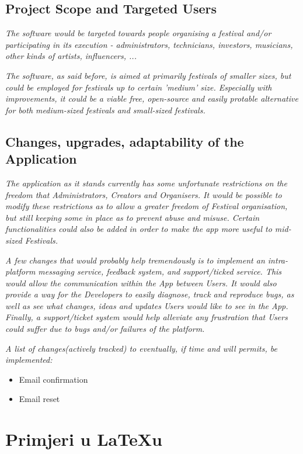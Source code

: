 	\subsection{Project Scope and Targeted Users}
	\textit{The software would be targeted towards people organising a festival and/or participating in its execution - administrators, technicians, investors, musicians, other kinds of artists, influencers, ...}
	
	\textit{The software, as said before, is aimed at primarily festivals of smaller sizes, but could be employed for festivals up to certain 'medium' size. Especially with improvements, it could be a viable free, open-source and easily protable alternative for both medium-sized festivals and small-sized festivals.}
	
	\subsection{Changes, upgrades, adaptability of the Application}
	\textit{The application as it stands currently has some unfortunate restrictions on the freedom that Administrators, Creators and Organisers. It would be possible to modify these restrictions as to allow a greater freedom of Festival organisation, but still keeping some in place as to prevent abuse and misuse. Certain functionalities could also be added in order to make the app more useful to mid-sized Festivals.}
	
	\textit{A few changes that would probably help tremendously is to implement an intra-platform messaging service, feedback system, and support/ticked service. This would allow the communication within the App between Users. It would also provide a way for the Developers to easily diagnose, track and reproduce bugs, as well as see what changes, ideas and updates Users would like to see in the App. Finally, a support/ticket system would help alleviate any frustration that Users could suffer due to bugs and/or failures of the platform.}
	
	\textit{A list of changes(actively tracked) to eventually, if time and will permits, be implemented:}
	\begin{itemize}
		\item Email confirmation
		\item Email reset
	\end{itemize}


\section{Primjeri u LaTeXu}

